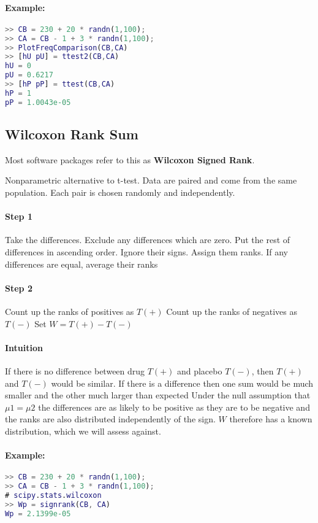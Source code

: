 \documentclass[a4paper]{article}
\begin{document}
\paragraph{Example:}

\begin{lstlisting}[language=Matlab]
>> CB = 230 + 20 * randn(1,100);
>> CA = CB - 1 + 3 * randn(1,100);
>> PlotFreqComparison(CB,CA)
>> [hU pU] = ttest2(CB,CA)
hU = 0
pU = 0.6217
>> [hP pP] = ttest(CB,CA)
hP = 1
pP = 1.0043e-05
\end{lstlisting}

\subsection{Wilcoxon Rank Sum}
Most software packages refer to this as \textbf{Wilcoxon Signed Rank}.

Nonparametric alternative to t-test.
Data are paired and come from the same population.
Each pair is chosen randomly and independently.

\paragraph{Step 1}
Take the differences.
Exclude any differences which are zero.
Put the rest of differences in ascending order.
Ignore their signs.
Assign them ranks.
If any differences are equal, average their ranks

\paragraph{Step 2}
Count up the ranks of positives as $T(+)$
Count up the ranks of negatives as $T(-)$
Set $W = T(+) - T(-)$

\paragraph{Intuition}
If there is no difference between drug $T(+)$ and placebo $T(-)$, then $T(+)$ and $T(-)$ would be similar.
If there is a difference then one sum would be much smaller and the other much larger than expected
Under the null assumption that $\mu1 = \mu2$ the differences are as likely to be positive as they are to be negative and the ranks are also distributed independently of the sign.
$W$ therefore has a known distribution, which we will assess against.

\paragraph{Example:}
\begin{lstlisting}[language=Matlab]
>> CB = 230 + 20 * randn(1,100);
>> CA = CB - 1 + 3 * randn(1,100);
# scipy.stats.wilcoxon
>> Wp = signrank(CB, CA)
Wp = 2.1399e-05
\end{lstlisting}
\end{document}
